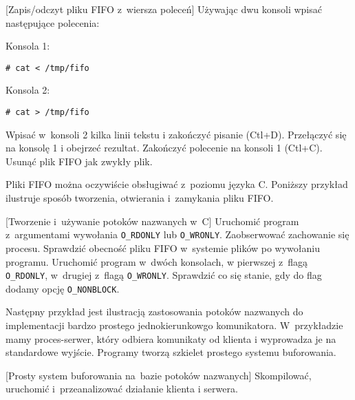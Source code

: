 \begin{example}{[Zapis/odczyt pliku FIFO z~wiersza poleceń]}
Używając dwu konsoli wpisać następujące polecenia:

Konsola 1:
\begin{lstlisting}[style=MyBashStyle]
# cat < /tmp/fifo
\end{lstlisting}

Konsola 2:
\begin{lstlisting}[style=MyBashStyle]
# cat > /tmp/fifo
\end{lstlisting}

Wpisać w~konsoli 2 kilka linii tekstu i zakończyć pisanie (Ctl+D). Przełączyć
się na konsolę 1 i obejrzeć rezultat. Zakończyć polecenie na konsoli 1 (Ctl+C).
Usunąć plik FIFO jak zwykły plik.
\end{example}

Pliki FIFO można oczywiście obsługiwać z~poziomu języka C. Poniższy przykład
ilustruje sposób tworzenia, otwierania i~zamykania pliku FIFO.
\begin{example}{[Tworzenie i~używanie potoków nazwanych w~C]}
  Uruchomić program z~argumentami wywołania \texttt{O\_RDONLY} lub
  \texttt{O\_WRONLY}. Zaobserwować zachowanie się procesu. Sprawdzić obecność
  pliku FIFO w~systemie plików po wywołaniu programu. Uruchomić program w~dwóch
  konsolach, w pierwszej z~flagą \texttt{O\_RDONLY}, w~drugiej z~flagą
  \texttt{O\_WRONLY}. Sprawdzić co się stanie, gdy do flag dodamy opcję
  \texttt{O\_NONBLOCK}.
  
\end{example}

Następny przykład jest ilustracją zastosowania potoków nazwanych do
implementacji bardzo prostego jednokierunkowgo komunikatora. W~przykładzie mamy
proces-serwer, który odbiera komunikaty od klienta i wyprowadza je na
standardowe wyjście. Programy tworzą szkielet prostego systemu buforowania.
\begin{example}{[Prosty system buforowania na~bazie potoków nazwanych]}
  Skompilować, uruchomić i~przeanalizować działanie klienta i serwera.
  
  
\end{example}

